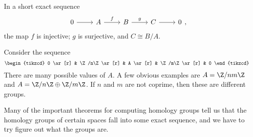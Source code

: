 \documentclass[a4paper]{article}
\begin{document}
\begin{lemma}
  In a short exact sequence 
  \[
    \begin{tikzcd}
      0 \ar[r] & A \ar[r, "f"] & B \ar[r, "g"] & C \ar[r] & 0
    \end{tikzcd},
  \]
  the map $f$ is injective; $g$ is surjective, and $C \cong B/A$.
\end{lemma}

\begin{eg}
  Consider the sequence
  \[
    \begin{tikzcd}
      0 \ar[r] & \Z/n\Z \ar[r] & A \ar[r] & \Z/m\Z \ar[r] & 0
    \end{tikzcd}
  \]
  There are many possible values of $A$. A few obvious examples are $A = \Z/nm\Z$ and $A = \Z/n\Z \oplus \Z/m\Z$. If $n$ and $m$ are not coprime, then these are different groups.
\end{eg}
Many of the important theorems for computing homology groups tell us that the homology groups of certain spaces fall into some exact sequence, and we have to try figure out what the groups are.
\end{document}
